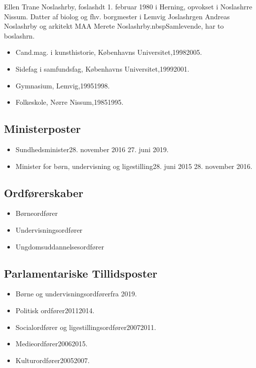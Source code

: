 \documentclass[11pt, a4paper]{awesome-cv}
\begin{document}
\makecvheader[R]
\makelettertitle
\begin{cvletter}
Ellen Trane Noslashrby, foslashdt 1. februar 1980 i Herning, opvokset i Noslashrre Nissum. Datter af biolog og fhv. borgmester i Lemvig Joslashrgen Andreas Noslashrby og arkitekt MAA Merete Noslashrby.nbspSamlevende, har to boslashrn.

\begin{itemize}
\item Cand.mag. i kunsthistorie, Københavns Universitet,19982005.
\item Sidefag i samfundsfag, Københavns Universitet,19992001.
\item Gymnasium, Lemvig,19951998.
\item Folkeskole, Nørre Nissum,19851995.
\end{itemize}
\subsection*{Ministerposter}
\begin{itemize}
\item Sundhedsminister28. november 2016  27. juni 2019.
\item Minister for børn, undervisning og ligestilling28. juni 2015  28. november 2016.
\end{itemize}
\subsection*{Ordførerskaber}
\begin{itemize}
\item Børneordfører
\item Undervisningsordfører
\item Ungdomsuddannelsesordfører
\end{itemize}
\subsection*{Parlamentariske Tillidsposter}
\begin{itemize}
\item Børne og undervisningsordførerfra 2019.
\item Politisk ordfører20112014.
\item Socialordfører og ligestillingsordfører20072011.
\item Medieordfører20062015.
\item Kulturordfører20052007.
\end{itemize}

\end{cvletter}
\end{document}
